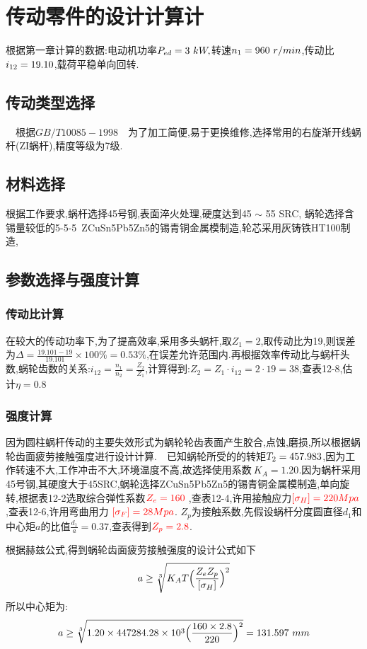 \documentclass[UTF8,11pt,a4paper,oneside,final,zihao=-4,]{ctexrep}%
\newcommand{\two}[1]{\num[round-mode=places,round-precision=2] #1} %
\newcommand{\three}[1]{\num[round-mode=places,round-precision=3] #1} %
\begin{document}
	\chapter{传动零件的设计计算计}
	根据第一章计算的数据:电动机功率$P_{ed}=3 \ kW,$转速$n_1=\NI \ r/min$,传动比$i_{12}=\two{\Ia}$,载荷平稳单向回转.
	\section{传动类型选择} \ \
	根据$GB/T 10085-1998$\ \ 为了加工简便,易于更换维修,选择常用的右旋渐开线蜗杆(ZI蜗杆),精度等级为7级.
	\section{材料选择}
	根据工作要求,蜗杆选择45号钢,表面淬火处理,硬度达到45 $\sim$ 55 SRC, 蜗轮选择含锡量较低的5-5-5\ ZCuSn5Pb5Zn5的锡青铜金属模制造,轮芯采用灰铸铁HT100制造,
	\section{参数选择与强度计算}
	\subsection{传动比计算}
	在较大的传动功率下,为了提高效率,采用多头蜗杆,取$Z_1=2$,取传动比为19,则误差为$\Delta=\frac{19.101-19}{19.101}\times100\%=0.53\%$,在误差允许范围内.再根据效率传动比与蜗杆头数,蜗轮齿数的关系:$i_{12}=\frac{n_1}{n_2}=\frac{Z_2}{Z_1}$,计算得到:$Z_2=Z_1 \cdot i_{12}=2\cdot19=38$,查表12-8,估计$\eta=0.8$
	
	\subsection{强度计算}
	因为圆柱蜗杆传动的主要失效形式为蜗轮轮齿表面产生胶合,点蚀,磨损,所以根据蜗轮齿面疲劳接触强度进行设计计算.\ \
	已知蜗轮所受的的转矩$T_2=\three{\TII}$,因为工作转速不大,工作冲击不大,环境温度不高,故选择使用系数{\color{red}$\ K_A=1.20$.}因为蜗杆采用45号钢,其硬度大于45SRC,蜗轮选择ZCuSn5Pb5Zn5的锡青铜金属模制造,单向旋转,根据表12-2选取综合弹性系数${\color{red}Z_e=160\ }$,查表12-4,许用接触应力${\color{red}[\sigma_H ]=220Mpa}$,查表12-6,许用弯曲用力${\color{red}\ [ \sigma_F ]=28Mpa}$.
	$Z_p$为接触系数,先假设蜗杆分度圆直径$d_1$和中心矩$a$的比值$\frac{d_1}{a}=0.37$,查表得到${\color{red}Z_p=2.8}$.\ \
	
	根据赫兹公式,得到蜗轮齿面疲劳接触强度的设计公式如下$$a\ge\sqrt[3]{K_AT \Bigl(\frac{Z_e Z_p}{[ \sigma_H ]} \Bigl)^2} $$
	所以中心矩为:
	$$a\ge\sqrt[3]{1.20\times 447284.28\times10^3 \Bigl(\frac{160\times2.8}{220} \Bigl)^2}= 131.597\ mm$$
\end{document}
